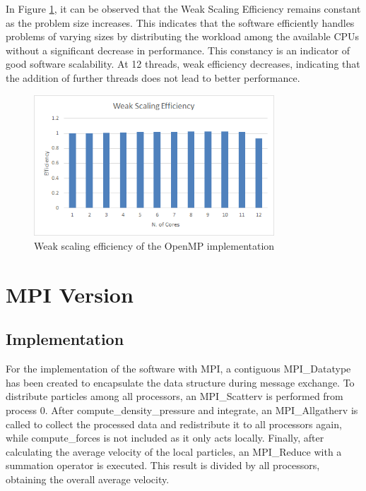 \documentclass[a4paper, 12pt]{report}
\begin{document}
\begin{sloppypar}
  \newpage
  \noindent
  In Figure \ref{fig:omp_wse}, it can be observed that the Weak Scaling Efficiency remains constant as the problem size increases. This indicates that the software efficiently handles problems of varying sizes by distributing the workload among the available CPUs without a significant decrease in performance. This constancy is an indicator of good software scalability. At 12 threads, weak efficiency decreases, indicating that the addition of further threads does not lead to better performance.

  \begin{figure}[ht]
    \centering
    \includegraphics[width=9cm]{img/omp-wse.png}
    \caption{Weak scaling efficiency of the OpenMP implementation}
    \label{fig:omp_wse}
  \end{figure}
\end{sloppypar}

{\let\clearpage\relax\chapter*{MPI Version}}
\section*{Implementation}
For the implementation of the software with MPI, a contiguous MPI\_Datatype has been created to encapsulate the data structure during message exchange. To distribute particles among all processors, an MPI\_Scatterv is performed from process 0. After compute\_density\_pressure and integrate, an MPI\_Allgatherv is called to collect the processed data and redistribute it to all processors again, while compute\_forces is not included as it only acts locally. Finally, after calculating the average velocity of the local particles, an MPI\_Reduce with a summation operator is executed. This result is divided by all processors, obtaining the overall average velocity.
\end{document}
